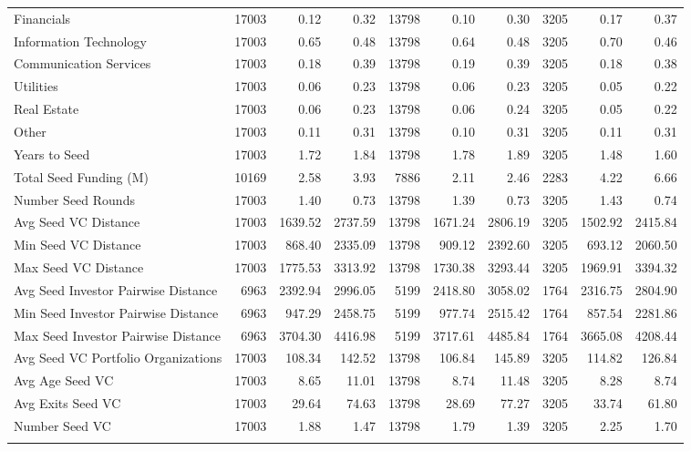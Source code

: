 \begin{table}[!h]
{\begin{tabular}[t]{lrrrrrrrrr}
Financials & 17003 & 0.12 & 0.32 & 13798 & 0.10 & 0.30 & 3205 & 0.17 & 0.37\\
Information Technology & 17003 & 0.65 & 0.48 & 13798 & 0.64 & 0.48 & 3205 & 0.70 & 0.46\\
Communication Services & 17003 & 0.18 & 0.39 & 13798 & 0.19 & 0.39 & 3205 & 0.18 & 0.38\\
Utilities & 17003 & 0.06 & 0.23 & 13798 & 0.06 & 0.23 & 3205 & 0.05 & 0.22\\
\addlinespace
Real Estate & 17003 & 0.06 & 0.23 & 13798 & 0.06 & 0.24 & 3205 & 0.05 & 0.22\\
Other & 17003 & 0.11 & 0.31 & 13798 & 0.10 & 0.31 & 3205 & 0.11 & 0.31\\
Years to Seed & 17003 & 1.72 & 1.84 & 13798 & 1.78 & 1.89 & 3205 & 1.48 & 1.60\\
Total Seed Funding (M) & 10169 & 2.58 & 3.93 & 7886 & 2.11 & 2.46 & 2283 & 4.22 & 6.66\\
Number Seed Rounds & 17003 & 1.40 & 0.73 & 13798 & 1.39 & 0.73 & 3205 & 1.43 & 0.74\\
\addlinespace
Avg Seed VC Distance & 17003 & 1639.52 & 2737.59 & 13798 & 1671.24 & 2806.19 & 3205 & 1502.92 & 2415.84\\
Min Seed VC Distance & 17003 & 868.40 & 2335.09 & 13798 & 909.12 & 2392.60 & 3205 & 693.12 & 2060.50\\
Max Seed VC Distance & 17003 & 1775.53 & 3313.92 & 13798 & 1730.38 & 3293.44 & 3205 & 1969.91 & 3394.32\\
Avg Seed Investor Pairwise Distance & 6963 & 2392.94 & 2996.05 & 5199 & 2418.80 & 3058.02 & 1764 & 2316.75 & 2804.90\\
Min Seed Investor Pairwise Distance & 6963 & 947.29 & 2458.75 & 5199 & 977.74 & 2515.42 & 1764 & 857.54 & 2281.86\\
\addlinespace
Max Seed Investor Pairwise Distance & 6963 & 3704.30 & 4416.98 & 5199 & 3717.61 & 4485.84 & 1764 & 3665.08 & 4208.44\\
Avg Seed VC Portfolio Organizations & 17003 & 108.34 & 142.52 & 13798 & 106.84 & 145.89 & 3205 & 114.82 & 126.84\\
Avg Age Seed VC & 17003 & 8.65 & 11.01 & 13798 & 8.74 & 11.48 & 3205 & 8.28 & 8.74\\
Avg Exits Seed VC & 17003 & 29.64 & 74.63 & 13798 & 28.69 & 77.27 & 3205 & 33.74 & 61.80\\
Number Seed VC & 17003 & 1.88 & 1.47 & 13798 & 1.79 & 1.39 & 3205 & 2.25 & 1.70\\
\addlinespace

\end{tabular}}
\end{table}
